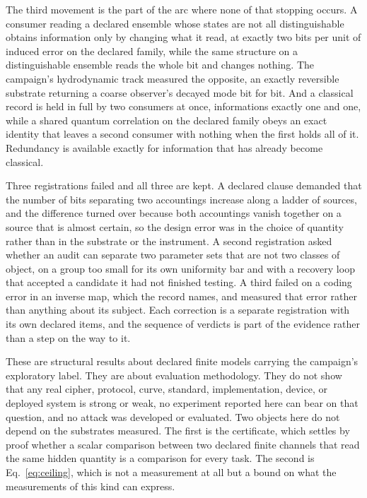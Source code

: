 \documentclass[aps,pre,reprint,nofootinbib]{revtex4-2}
\begin{document}
The third movement is the part of the arc where none of that stopping
occurs.  A consumer reading a declared ensemble
whose states are not all distinguishable obtains information only by
changing what it read, at exactly two bits per unit of induced error
on the declared family, while the same structure on a distinguishable
ensemble reads the whole bit and changes nothing.  The campaign's
hydrodynamic track measured the opposite, an exactly reversible
substrate returning a coarse observer's decayed mode bit for bit.  And a classical record is held in full by two consumers
at once, informations exactly one and one, while a shared quantum
correlation on the declared family obeys an exact identity that leaves
a second consumer with nothing when the first holds all of it.
Redundancy is available exactly for
information that has already become classical.

Three registrations failed and all three are kept.  A declared clause
demanded that the number of bits separating two accountings increase
along a ladder of sources, and the difference turned over because both
accountings vanish together on a source that is almost certain, so the
design error was in the choice of quantity rather than in the
substrate or the instrument.  A second registration asked whether an
audit can separate two parameter sets that are not two classes of
object, on a group too small for its own uniformity bar and with a
recovery loop that accepted a candidate it had not finished testing.
A third failed on a coding error in an inverse map, which the record
names, and measured that error rather than anything about its subject.
Each correction is a separate registration with its own declared
items, and the sequence of verdicts is part of the evidence rather
than a step on the way to it.

These are structural results about declared finite models carrying the
campaign's exploratory label.  They are about evaluation methodology.
They do not show that any real cipher, protocol, curve, standard,
implementation, device, or deployed system is strong or weak, no
experiment reported here can bear on that question, and no attack was
developed or evaluated.  Two objects here do not depend on the
substrates measured.  The first is the certificate, which settles by
proof whether a scalar comparison between two declared finite channels
that read the same hidden quantity is a comparison for every task.
The second is Eq.~\eqref{eq:ceiling}, which is not a measurement at
all but a bound on what the measurements of this kind can express.
\end{document}
